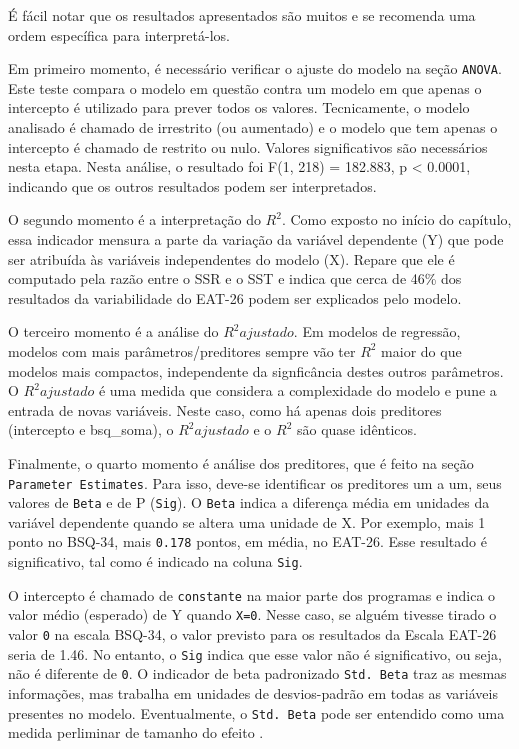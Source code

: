 \documentclass[
]{book}
\begin{document}
É fácil notar que os resultados apresentados são muitos e se recomenda uma ordem específica para interpretá-los.

Em primeiro momento, é necessário verificar o ajuste do modelo na seção \texttt{ANOVA}. Este teste compara o modelo em questão contra um modelo em que apenas o intercepto é utilizado para prever todos os valores. Tecnicamente, o modelo analisado é chamado de irrestrito (ou aumentado) e o modelo que tem apenas o intercepto é chamado de restrito ou nulo. Valores significativos são necessários nesta etapa. Nesta análise, o resultado foi F(1, 218) = 182.883, p \textless{} 0.0001, indicando que os outros resultados podem ser interpretados.

O segundo momento é a interpretação do \(R^2\). Como exposto no início do capítulo, essa indicador mensura a parte da variação da variável dependente (Y) que pode ser atribuída às variáveis independentes do modelo (X). Repare que ele é computado pela razão entre o SSR e o SST e indica que cerca de 46\% dos resultados da variabilidade do EAT-26 podem ser explicados pelo modelo.

O terceiro momento é a análise do \(R^2 ajustado\). Em modelos de regressão, modelos com mais parâmetros/preditores sempre vão ter \(R^2\) maior do que modelos mais compactos, independente da signficância destes outros parâmetros. O \(R^2 ajustado\) é uma medida que considera a complexidade do modelo e pune a entrada de novas variáveis. Neste caso, como há apenas dois preditores (intercepto e bsq\_soma), o \(R^2 ajustado\) e o \(R^2\) são quase idênticos.

Finalmente, o quarto momento é análise dos preditores, que é feito na seção \texttt{Parameter\ Estimates}. Para isso, deve-se identificar os preditores um a um, seus valores de \texttt{Beta} e de P (\texttt{Sig}). O \texttt{Beta} indica a diferença média em unidades da variável dependente quando se altera uma unidade de X. Por exemplo, mais 1 ponto no BSQ-34, mais \texttt{0.178} pontos, em média, no EAT-26. Esse resultado é significativo, tal como é indicado na coluna \texttt{Sig}.

O intercepto é chamado de \texttt{constante} na maior parte dos programas e indica o valor médio (esperado) de Y quando \texttt{X=0}. Nesse caso, se alguém tivesse tirado o valor \texttt{0} na escala BSQ-34, o valor previsto para os resultados da Escala EAT-26 seria de 1.46. No entanto, o \texttt{Sig} indica que esse valor não é significativo, ou seja, não é diferente de \texttt{0}. O indicador de beta padronizado \texttt{Std.\ Beta} traz as mesmas informações, mas trabalha em unidades de desvios-padrão em todas as variáveis presentes no modelo. Eventualmente, o \texttt{Std.\ Beta} pode ser entendido como uma medida perliminar de tamanho do efeito \citep{fox2016}.
\end{document}
